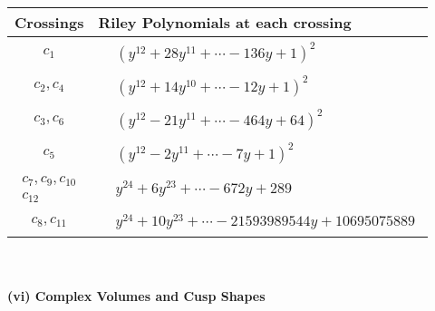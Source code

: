 \documentclass[1p]{elsarticle_modified}
\theoremstyle{definition}
\begin{document}
\begin{tabular}{m{50pt}|m{274pt}}
Crossings & \hspace{64pt}Riley Polynomials at each crossing \\
\hline $$\begin{aligned}c_{1}\end{aligned}$$&$\begin{aligned}
&(y^{12}+28 y^{11}+\cdots-136 y+1)^{2}
\end{aligned}$\\
\hline $$\begin{aligned}c_{2},c_{4}\end{aligned}$$&$\begin{aligned}
&(y^{12}+14 y^{10}+\cdots-12 y+1)^{2}
\end{aligned}$\\
\hline $$\begin{aligned}c_{3},c_{6}\end{aligned}$$&$\begin{aligned}
&(y^{12}-21 y^{11}+\cdots-464 y+64)^{2}
\end{aligned}$\\
\hline $$\begin{aligned}c_{5}\end{aligned}$$&$\begin{aligned}
&(y^{12}-2 y^{11}+\cdots-7 y+1)^{2}
\end{aligned}$\\
\hline $$\begin{aligned}c_{7},c_{9},c_{10}\\c_{12}\end{aligned}$$&$\begin{aligned}
&y^{24}+6 y^{23}+\cdots-672 y+289
\end{aligned}$\\
\hline $$\begin{aligned}c_{8},c_{11}\end{aligned}$$&$\begin{aligned}
&y^{24}+10 y^{23}+\cdots-21593989544 y+10695075889
\end{aligned}$\\
\hline
\end{tabular}\\~\\
\newpage\flushleft \textbf{(vi) Complex Volumes and Cusp Shapes}
\end{document}
